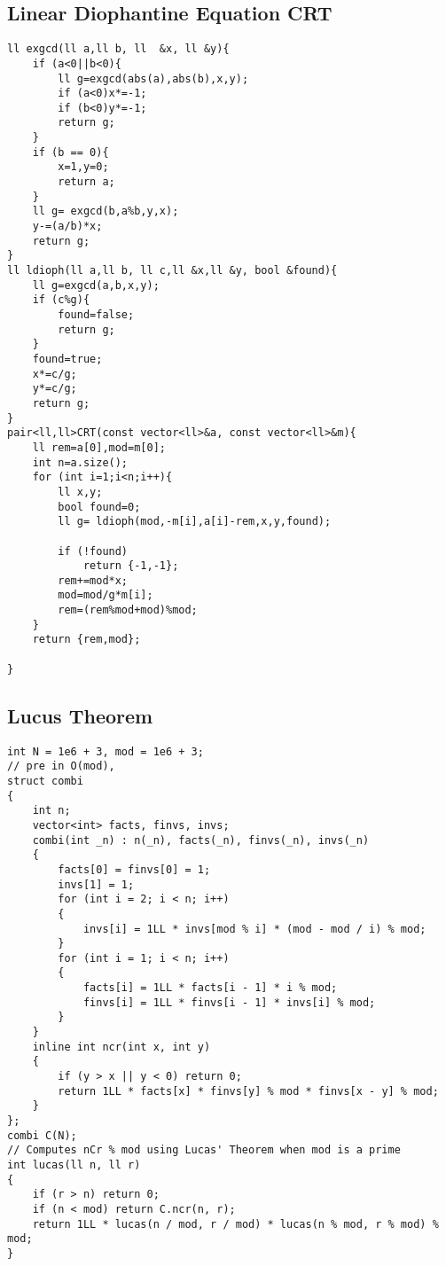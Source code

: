 \documentclass{article}
\begin{document}
\subsection{Linear Diophantine Equation CRT}
\begin{verbatim}
ll exgcd(ll a,ll b, ll  &x, ll &y){
    if (a<0||b<0){
        ll g=exgcd(abs(a),abs(b),x,y);
        if (a<0)x*=-1;
        if (b<0)y*=-1;
        return g;
    }
    if (b == 0){
        x=1,y=0;
        return a;
    }
    ll g= exgcd(b,a%b,y,x);
    y-=(a/b)*x;
    return g;
}
ll ldioph(ll a,ll b, ll c,ll &x,ll &y, bool &found){
    ll g=exgcd(a,b,x,y);
    if (c%g){
        found=false;
        return g;
    }
    found=true;
    x*=c/g;
    y*=c/g;
    return g;
}
pair<ll,ll>CRT(const vector<ll>&a, const vector<ll>&m){
    ll rem=a[0],mod=m[0];
    int n=a.size();
    for (int i=1;i<n;i++){
        ll x,y;
        bool found=0;
        ll g= ldioph(mod,-m[i],a[i]-rem,x,y,found);

        if (!found)
            return {-1,-1};
        rem+=mod*x;
        mod=mod/g*m[i];
        rem=(rem%mod+mod)%mod;
    }
    return {rem,mod};

}
\end{verbatim}

\subsection{Lucus Theorem}
\begin{verbatim}
int N = 1e6 + 3, mod = 1e6 + 3;
// pre in O(mod),
struct combi
{
	int n;
	vector<int> facts, finvs, invs;
	combi(int _n) : n(_n), facts(_n), finvs(_n), invs(_n)
	{
		facts[0] = finvs[0] = 1;
		invs[1] = 1;
		for (int i = 2; i < n; i++)
		{
			invs[i] = 1LL * invs[mod % i] * (mod - mod / i) % mod;
		}
		for (int i = 1; i < n; i++)
		{
			facts[i] = 1LL * facts[i - 1] * i % mod;
			finvs[i] = 1LL * finvs[i - 1] * invs[i] % mod;
		}
	}
	inline int ncr(int x, int y)
	{
		if (y > x || y < 0) return 0;
		return 1LL * facts[x] * finvs[y] % mod * finvs[x - y] % mod;
	}
};
combi C(N);
// Computes nCr % mod using Lucas' Theorem when mod is a prime
int lucas(ll n, ll r)
{
	if (r > n) return 0;
	if (n < mod) return C.ncr(n, r);
	return 1LL * lucas(n / mod, r / mod) * lucas(n % mod, r % mod) % mod;
}
\end{verbatim}
\end{document}

